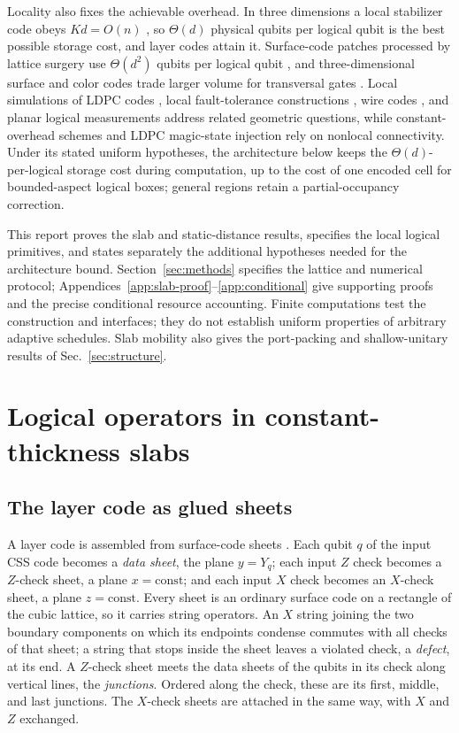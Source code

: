 Locality also fixes the achievable overhead. In three dimensions a local
stabilizer code obeys $Kd=O(n)$ \cite{BPT}, so $\Theta(d)$ physical qubits
per logical qubit is the best possible storage cost, and layer codes attain
it. Surface-code patches processed by lattice surgery use $\Theta(d^2)$
qubits per logical qubit \cite{HorsmanLatticeSurgery,LitinskiSurgery}, and
three-dimensional surface and color codes trade larger volume for
transversal gates \cite{VasmerBrowne}. Local simulations of LDPC codes
\cite{PattisonHierarchical}, local fault-tolerance constructions
\cite{ChoeKoenigLocal}, wire codes \cite{BaspinWire}, and planar logical
measurements \cite{YangPlanar} address related geometric questions, while
constant-overhead schemes
\cite{GottesmanFTThreshold,KovalevPryadko,FawziGrospellierLeverrier} and LDPC
magic-state injection \cite{ZhangInjectionIndependence,LiuInSituInjection}
rely on nonlocal connectivity. Under its stated uniform hypotheses, the architecture below keeps the
$\Theta(d)$-per-logical storage cost during computation, up to the cost of
one encoded cell for bounded-aspect logical boxes; general regions retain
a partial-occupancy correction.

This report proves the slab and static-distance results, specifies the local
logical primitives, and states separately the additional hypotheses needed
for the architecture bound. Section~\ref{sec:methods} specifies the lattice
and numerical protocol; Appendices~\ref{app:slab-proof}--\ref{app:conditional}
give supporting proofs and the precise conditional resource accounting.
Finite computations test the construction and interfaces; they do not
establish uniform properties of arbitrary adaptive schedules. Slab mobility
also gives the port-packing and shallow-unitary results of
Sec.~\ref{sec:structure}.

\section{Logical operators in constant-thickness slabs}
\label{sec:slabs}
\subsection{The layer code as glued sheets}
A layer code is assembled from surface-code sheets
\cite{WilliamsonBaspinLayerCodes}.  Each qubit $q$ of the input CSS code
becomes a \emph{data sheet}, the plane $y=Y_q$; each input $Z$ check becomes
a $Z$-check sheet, a plane $x=\mathrm{const}$; and each input $X$ check
becomes an $X$-check sheet, a plane $z=\mathrm{const}$.  Every sheet is an
ordinary surface code on a rectangle of the cubic lattice, so it carries
string operators.  An $X$ string joining the two boundary components on which its endpoints
condense commutes with all checks of that sheet; a string that
stops inside the sheet leaves a violated check, a \emph{defect}, at its end.
A $Z$-check sheet meets the data sheets of the qubits in its check along
vertical lines, the \emph{junctions}.  Ordered along the check, these are its
first, middle, and last junctions.  The $X$-check sheets are attached in the
same way, with $X$ and $Z$ exchanged.

